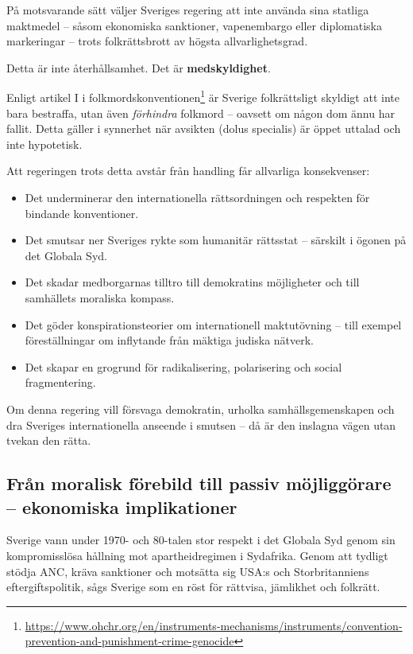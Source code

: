 \documentclass[12pt]{article}
\begin{document}
På motsvarande sätt väljer Sveriges regering att inte använda sina statliga maktmedel – såsom ekonomiska sanktioner, vapenembargo eller diplomatiska markeringar – trots folkrättsbrott av högsta allvarlighetsgrad.

Detta är inte återhållsamhet. Det är \textbf{medskyldighet}.

Enligt artikel I i folkmordskonventionen\footnote{\url{https://www.ohchr.org/en/instruments-mechanisms/instruments/convention-prevention-and-punishment-crime-genocide}} är Sverige folkrättsligt skyldigt att inte bara bestraffa, utan även \textit{förhindra} folkmord – oavsett om någon dom ännu har fallit. Detta gäller i synnerhet när avsikten (dolus specialis) är öppet uttalad och inte hypotetisk.

Att regeringen trots detta avstår från handling får allvarliga konsekvenser:

\begin{itemize}
  \item Det underminerar den internationella rättsordningen och respekten för bindande konventioner.
  \item Det smutsar ner Sveriges rykte som humanitär rättsstat – särskilt i ögonen på det Globala Syd.
  \item Det skadar medborgarnas tilltro till demokratins möjligheter och till samhällets moraliska kompass.
  \item Det göder konspirationsteorier om internationell maktutövning – till exempel föreställningar om inflytande från mäktiga judiska nätverk.
  \item Det skapar en grogrund för radikalisering, polarisering och social fragmentering.
\end{itemize}

Om denna regering vill försvaga demokratin, urholka samhällsgemenskapen och dra Sveriges internationella anseende i smutsen – då är den inslagna vägen utan tvekan den rätta.






\subsection*{Från moralisk förebild till passiv möjliggörare – ekonomiska implikationer}

Sverige vann under 1970- och 80-talen stor respekt i det Globala Syd genom sin kompromisslösa hållning mot apartheidregimen i Sydafrika. Genom att tydligt stödja ANC, kräva sanktioner och motsätta sig USA:s och Storbritanniens eftergiftspolitik, sågs Sverige som en röst för rättvisa, jämlikhet och folkrätt.
\end{document}
